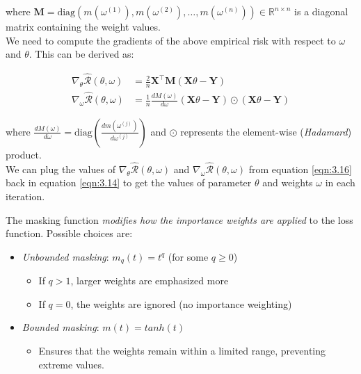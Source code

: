 where $\mathbf{M} = \text{diag}(m(\omega^{(1)}), m(\omega^{(2)}), \ldots, m(\omega^{(n)})) \in \mathbb{R}^{n \times n}$ is a diagonal matrix containing the weight values.\\

We need to compute the gradients of the above empirical risk with respect to $\omega$ and $\theta$. This can be derived as:

\begin{equation}
    \begin{aligned}
        \nabla_{\theta}\hat{\mathcal{R}}(\theta, \omega) &= \frac{2}{n}\mathbf{X}^\top\mathbf{M}(\mathbf{X}\theta - \mathbf{Y})\\
        \nabla_{\omega}\hat{\mathcal{R}}(\theta, \omega) &= \frac{1}{n} \frac{dM(\omega)}{d\omega} (\mathbf{X}\theta - \mathbf{Y}) \odot (\mathbf{X}\theta - \mathbf{Y})
    \end{aligned}
    \label{eqn:3.16}
\end{equation}

\vspace{1em}
where $\frac{dM(\omega)}{d\omega} = \text{diag}\left(\frac{dm(\omega^{(j)})}{d\omega^{(j)}}\right)$ and $\odot$ represents the element-wise (\emph{Hadamard}) product.\\

We can plug the values of $\nabla_{\theta}\hat{\mathcal{R}}(\theta, \omega)$ and $\nabla_{\omega}\hat{\mathcal{R}}(\theta, \omega)$ from equation \ref{eqn:3.16} back in equation \ref{eqn:3.14} to get the values of parameter $\theta$ and weights $\omega$ in each iteration.

\vspace{1em}
\begin{definition}\label{masking}
The masking function \emph{modifies how the importance weights are applied} to the loss function. Possible choices are:
\begin{itemize}
    \item \emph{Unbounded masking}: $m_q(t) = t^q$ (for some $q \geq 0$)
    \begin{itemize}
        \item If $q > 1$, larger weights are emphasized more
        \item If $q = 0$, the weights are ignored (no importance weighting)
    \end{itemize}
    \item \emph{Bounded masking}: $m(t) = tanh(t)$
    \begin{itemize}
        \item Ensures that the weights remain within a limited range, preventing extreme values.
    \end{itemize}
\end{itemize}

\end{definition}

